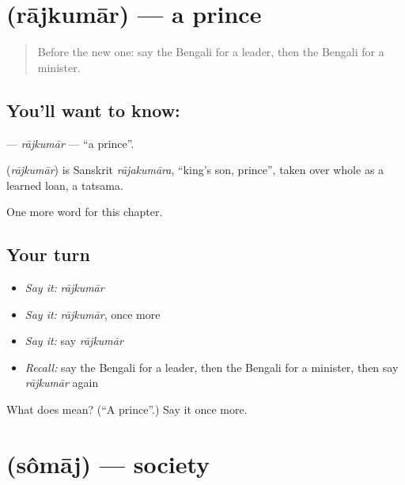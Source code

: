 \section[\texorpdfstring{\bn{রাজকুমার} (rājkumār)}{রাজকুমার (rājkumār)}]{ (rājkumār) — a prince}

\label{lesson:BN-C230-rajkumar}



\begin{quote}
Before the new one: say the Bengali for a leader, then the Bengali for a minister.
\end{quote}

\subsection*{You'll want to know: }
\textbf{} — \emph{rājkumār} — \textquotedblleft{}a prince\textquotedblright{}.

\begin{cousinweb}
\textbf{} (\emph{rājkumār}) is Sanskrit \emph{rājakumāra}, \textquotedblleft{}king's son, prince\textquotedblright{}, taken over whole as a learned loan, a tatsama.
\end{cousinweb}

\begin{grammarlens}[title={What you've built}]
One more word for this chapter.
\end{grammarlens}

\subsection*{Your turn}
\begin{itemize}
\raggedright
  \item \emph{Say it:} \emph{rājkumār}
  \item \emph{Say it:} \emph{rājkumār}, once more
  \item \emph{Say it:} say \emph{rājkumār}
  \item \emph{Recall:} say the Bengali for a leader, then the Bengali for a minister, then say \emph{rājkumār} again
\end{itemize}

\begin{tcolorbox}[breakable,colback=teal!4,colframe=teal!35!black,title={Before you move on}]
What does  mean? (\textquotedblleft{}A prince\textquotedblright{}.) Say it once more.
\end{tcolorbox}
\section[\texorpdfstring{\bn{সমাজ} (sômāj)}{সমাজ (sômāj)}]{ (sômāj) — society}

